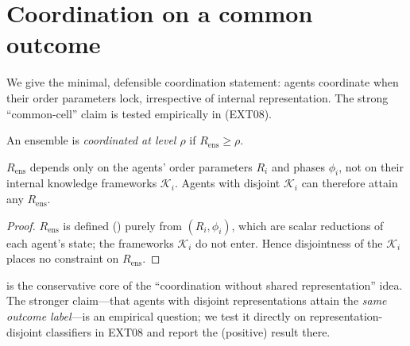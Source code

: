 \documentclass[11pt,twocolumn,a4paper]{article}
\newcommand{\K}{\mathcal{K}}
\newcommand{\Ord}{R}
\begin{document}
\section{Coordination on a common outcome}
\label{sec:coordination}

We give the minimal, defensible coordination statement: agents coordinate when
their order parameters lock, irrespective of internal representation. The
strong ``common-cell'' claim is tested empirically in 
(EXT08).

\begin{definition}\label{def:coordinated}
An ensemble is \emph{coordinated at level $\rho$} if $\Ord_{\mathrm{ens}}\ge\rho$.
\end{definition}

\begin{theorem}\label{thm:rep-indep}
$\Ord_{\mathrm{ens}}$ depends only on the agents' order parameters $\Ord_i$ and
phases $\phi_i$, not on their internal knowledge frameworks $\K_i$. Agents with
disjoint $\K_i$ can therefore attain any $\Ord_{\mathrm{ens}}$.
\end{theorem}

\begin{proof}
$\Ord_{\mathrm{ens}}$ is defined () purely from $(\Ord_i,
\phi_i)$, which are scalar reductions of each agent's state; the frameworks
$\K_i$ do not enter. Hence disjointness of the $\K_i$ places no constraint on
$\Ord_{\mathrm{ens}}$.
\end{proof}

\begin{remark}
 is the conservative core of the ``coordination without
shared representation'' idea. The stronger claim---that agents with disjoint
representations attain the \emph{same outcome label}---is an empirical question;
we test it directly on representation-disjoint classifiers in EXT08 and report
the (positive) result there.
\end{remark}
\end{document}

